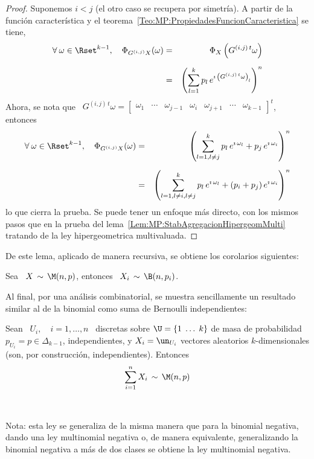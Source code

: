 \begin{proof}
  Suponemos $i <  j$ (el otro caso  se recupera por simetr\'ia). A  partir de la
  funci\'on                 caracter\'istica                 y                el
  teorema~\ref{Teo:MP:PropiedadesFuncionCaracteristica} se tiene,
  \begin{eqnarray*}
  \forall \: \omega \in \Rset^{k-1}, \quad \Phi_{G^{(i,j)} X}(\omega) & = &
  \Phi_X\left( G^{(i,j) \, t} \omega \right)\\[2mm]
  & = & \left( \sum_{l=1}^k p_l \, e^{\imath \, \left( G^{(i,j) \, t} \omega \right)_l } \right)^n
  \end{eqnarray*}
  Ahora,  se nota  que \  $G^{(i,j) \,  t} \omega  = \begin{bmatrix}  \omega_1 &
    \cdots    &   \omega_{j-1}   &    \omega_i   &    \omega_{j+1}   &    \cdots   &
    \omega_{k-1} \end{bmatrix}^t$, entonces
  \begin{eqnarray*}
  \forall \: \omega \in \Rset^{k-1}, \quad \Phi_{G^{(i,j)} X}(\omega) & = &
  \left( \sum_{l=1, l \ne j}^k p_l \, e^{\imath \, \omega_l} + p_j \, e^{\imath \,
  \omega_i } \right)^n\\[2mm]
  & = & \left( \sum_{l=1, l \ne i, l \ne j}^k p_l \, e^{\imath \, \omega_l} +
  (p_i+p_j) \, e^{\imath \, \omega_i } \right)^n
  \end{eqnarray*}
  lo que  cierra la  prueba. Se puede  tener un  enfoque m\'as directo,  con los
  mismos         pasos        que         en        la         prueba        del
  lema~\ref{Lem:MP:StabAgregacionHipergeomMulti}    tratando     de    la    ley
  hipergeometrica multivaluada.
\end{proof}

De este lema, aplicado de manera recursiva, se obtiene los corolarios siguientes:
%
\begin{corolario}\label{Cor:MP:MarginalMultinomial}
%
  Sea  \ $X  \,  \sim \,  \M(n,p)$, entonces  \  $\displaystyle X_i  \, \sim  \,
  \B(n,p_i)$.
\end{corolario}


Al  final,  por  una  an\'alisis  combinatorial,  se  muestra  sencillamente  un
resultado similar al de la binomial como suma de Bernoulli independientes:
%
\begin{lema}\label{Lem:MultinomialSumaMultiBernoulli}
%
  Sean \ $U_i, \quad i  = 1, \ldots , n$ \ discretas sobre $\U  = \{ 1 \; \ldots
  \;  k   \}$  de  masa  de   probabilidad  $p_{U_i}  =   p  \in  \Delta_{k-1}$,
  independientes, y $X_i  = \un_{U_i}$ vectores aleatorios $k$-dimensionales
  (son, por construcci\'on, independientes). Entonces
  \[
  \sum_{i=1}^n X_i \, \sim \, \M(n,p)
  \]
\end{lema}

\

Nota: esta ley  se generaliza de la misma manera que  para la binomial negativa,
dando una  ley multinomial negativa  o, de manera equivalente,  generalizando la
binomial  negativa  a  m\'as  de  dos  clases  se  obtiene  la  ley  multinomial
negativa. 
